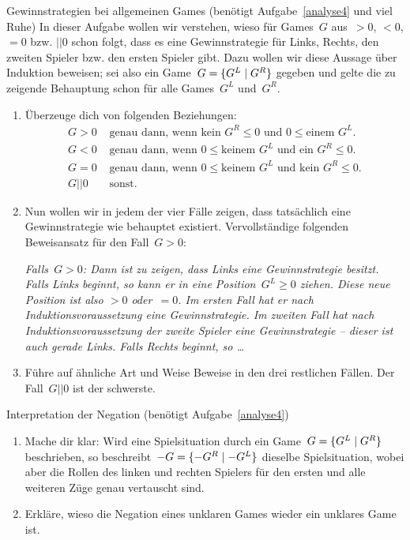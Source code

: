 \documentclass{zirkelblatt}
\newcommand{\fuzzy}{\mathrel{||}}
\begin{document}
\begin{aufgabe}{Gewinnstrategien bei allgemeinen Games (benötigt
Aufgabe~\ref{analyse4} und viel Ruhe)}
\label{gewinnstrategien}
In dieser Aufgabe wollen wir verstehen, wieso für Games~$G$ aus~$> 0$, $<
0$, $= 0$ bzw. $\fuzzy 0$ schon folgt, dass es eine Gewinnstrategie für Links,
Rechts, den zweiten Spieler bzw. den ersten Spieler gibt. Dazu wollen wir diese
Aussage über Induktion beweisen; sei also ein Game~$G = \{ G^L \mathrel{|} G^R \}$
gegeben und gelte die zu zeigende Behauptung schon für alle Games~$G^L$
und~$G^R$.
\begin{enumerate}
\item Überzeuge dich von folgenden Beziehungen:
\begin{align*}
  G > 0 &\text{ genau dann, wenn $\text{kein $G^R$} \leq 0$ und~$0 \leq \text{einem $G^L$}$.} \\
  G < 0 &\text{ genau dann, wenn $0 \leq \text{keinem $G^L$}$ und~$\text{ein $G^R$} \leq 0$.} \\
  G = 0 &\text{ genau dann, wenn $0 \leq \text{keinem $G^L$}$ und~$\text{kein $G^R$} \leq 0$.} \\
  G \fuzzy 0 &\text{ sonst.}
\end{align*}
\item Nun wollen wir in jedem der vier Fälle zeigen, dass tatsächlich eine Gewinnstrategie
wie behauptet existiert. Vervollständige folgenden Beweisansatz für den Fall~$G
> 0$:

\emph{Falls~$G > 0$: Dann ist zu zeigen, dass Links eine
Gewinnstrategie besitzt. Falls Links beginnt, so kann er in eine Position~$G^L
\geq 0$ ziehen. Diese neue Position ist also $> 0$ oder~$= 0$. Im ersten Fall
hat er nach Induktionsvoraussetzung eine Gewinnstrategie. Im zweiten Fall hat
nach Induktionsvoraussetzung der zweite Spieler eine Gewinnstrategie -- dieser
ist auch gerade Links. Falls Rechts beginnt, so \ldots}
\item Führe auf ähnliche Art und Weise Beweise in den drei restlichen Fällen.
Der Fall~$G \fuzzy 0$ ist der schwerste.
\end{enumerate}
\end{aufgabe}

\begin{aufgabe}{Interpretation der Negation (benötigt Aufgabe~\ref{analyse4})}
\label{game-negation}
\begin{enumerate}
\item Mache dir klar: Wird eine Spielsituation durch ein Game~$G =
\{ G^L \mathrel{|} G^R \}$ beschrieben,
so beschreibt~$-G = \{ -G^R \mathrel{|} -G^L \}$ dieselbe Spielsituation, wobei aber die Rollen des linken und
rechten Spielers für den ersten und alle weiteren Züge genau vertauscht sind.
\item Erkläre, wieso die Negation
eines unklaren Games wieder ein unklares Game ist.
\end{enumerate}
\end{aufgabe}
\end{document}
